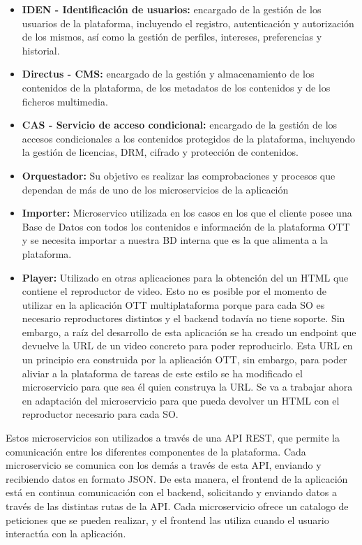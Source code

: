 \begin{itemize}
    \item \textbf{IDEN - Identificación de usuarios:} encargado de la gestión de los usuarios de la plataforma, incluyendo el registro,
    autenticación y autorización de los mismos, así como la gestión de perfiles, intereses, preferencias y historial. 
    \item \textbf{Directus - CMS:} encargado de la gestión y almacenamiento de los contenidos de la plataforma, de los
    metadatos de los contenidos y de los ficheros multimedia.
    \item \textbf{CAS - Servicio de acceso condicional:} encargado de la gestión de los accesos condicionales a los contenidos
    protegidos de la plataforma, incluyendo la gestión de licencias, DRM, cifrado y protección de contenidos.
    \item \textbf{Orquestador:} Su objetivo es realizar las comprobaciones y procesos que dependan de más de uno de los microservicios de la aplicación
    \item \textbf{Importer:} Microservico utilizada en los casos en los que el cliente posee una Base de Datos con todos los contenidos
    e información de la plataforma OTT y se necesita importar a nuestra BD interna que es la que alimenta a la plataforma.
    \item \textbf{Player:} Utilizado en otras aplicaciones para la obtención del un HTML que contiene el reproductor de video. Esto
    no es posible por el momento de utilizar en la aplicación OTT multiplataforma porque para cada SO es necesario reproductores 
    distintos y el backend todavía no tiene soporte. Sin embargo, a raíz del desarrollo de esta aplicación se ha creado un endpoint
    que devuelve la URL de un video concreto para poder reproducirlo. Esta URL en un principio era construida por la aplicación 
    OTT, sin embargo, para poder aliviar a la plataforma de tareas de este estilo se ha modificado el microservicio para que sea él quien
    construya la URL. Se va a trabajar ahora en adaptación del microservicio para que pueda devolver un HTML con el reproductor necesario
    para cada SO.
\end{itemize}


Estos microservicios son utilizados a través de una API REST, que permite la comunicación entre los diferentes componentes de la
plataforma. Cada microservicio se comunica con los demás a través de esta API, enviando y recibiendo datos en formato JSON.
De esta manera, el frontend de la aplicación está en continua comunicación con el backend, solicitando y enviando datos a través de
las distintas rutas de la API. Cada microservicio ofrece un catalogo de peticiones que se pueden realizar, y el frontend las utiliza
cuando el usuario interactúa con la aplicación. 

